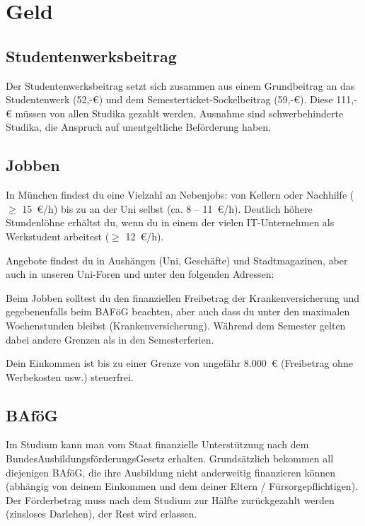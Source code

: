 ﻿
\section{Geld}

\subsection{Studentenwerksbeitrag}
Der Studentenwerksbeitrag setzt sich zusammen aus einem Grundbeitrag an das Studentenwerk (52,-€) und dem
Semesterticket-Sockelbeitrag (59,-€).
Diese 111,-€ müssen von allen Studika gezahlt werden, Ausnahme sind schwerbehinderte Studika, die Anspruch
auf unentgeltliche Beförderung haben.

\subsection{Jobben}
In München findest du eine Vielzahl an Nebenjobs: von Kellern oder Nachhilfe ($\geq$ 15~€/h) bis zu an der Uni selbst (ca. 8 -- 11~€/h). Deutlich höhere Stundenlöhne erhältst du, wenn du in einem der vielen IT-Unternehmen als Werkstudent arbeitest ($\geq$ 12~€/h).

Angebote findest du in Aushängen (Uni, Geschäfte) und Stadtmagazinen, aber auch in unseren Uni-Foren und unter den folgenden Adressen:
\begin{urlList}
\end{urlList}

Beim Jobben solltest du den finanziellen Freibetrag der Krankenversicherung und gegebenenfalls beim BAFöG beachten, aber auch dass du unter den maximalen Wochenstunden bleibst (Krankenversicherung). Während dem Semester gelten dabei andere Grenzen als in den Semesterferien.

Dein Einkommen ist bis zu einer Grenze von ungefähr 8.000~€ (Freibetrag ohne Werbekosten usw.) steuerfrei.


\subsection{BAföG}
Im Studium kann man vom Staat finanzielle Unterstützung nach dem BundesAusbildungsförderungsGesetz erhalten. Grundsätzlich bekommen all diejenigen BAföG, die ihre Ausbildung nicht anderweitig finanzieren können (abhängig von deinem Einkommen und dem deiner Eltern / Fürsorgepflichtigen). Der Förderbetrag muss nach dem Studium zur Hälfte zurückgezahlt werden (zinsloses Darlehen), der Rest wird erlassen.

